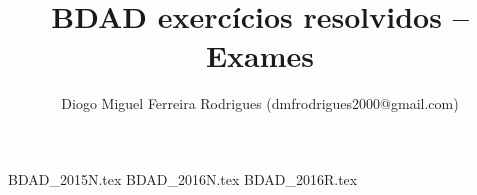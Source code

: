 \documentclass{bdad}
\title{BDAD exercícios resolvidos -- Exames}
\author{Diogo Miguel Ferreira Rodrigues (dmfrodrigues2000@gmail.com)}
\date{}
\begin{document}
\begingroup
\maketitle
    \let\clearpage\relax
	\tableofcontents
\endgroup
{BDAD_2015N.tex}
{BDAD_2016N.tex}
{BDAD_2016R.tex}
\end{document}
